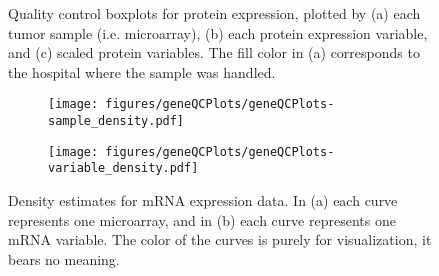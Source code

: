 \begin{figure}
	\centering
	\begin{subfigure}{1\textwidth}
		\centering
	\end{subfigure}
	\begin{subfigure}{1\textwidth}
		\centering
	\end{subfigure}
	\begin{subfigure}{1\textwidth}
		\centering
	\end{subfigure}

	\caption{Quality control boxplots for protein expression, plotted by
	(a) each tumor sample (i.e. microarray),
	(b) each protein expression variable, 
	and (c) scaled protein variables.
	The fill color in (a) corresponds to the hospital where the sample was handled.}
	\label{fig:qc-mrna-boxplot}
\end{figure}


\begin{figure}[!h]
	\centering
	\begin{subfigure}{.49\textwidth}
		\texttt{[image: figures/geneQCPlots/geneQCPlots-sample\_density.pdf]}
	\end{subfigure}
	\begin{subfigure}{.49\textwidth}
		\texttt{[image: figures/geneQCPlots/geneQCPlots-variable\_density.pdf]}
	\end{subfigure}

	\caption{Density estimates for mRNA expression data. In (a) each curve represents one microarray,
	and in (b) each curve represents one mRNA variable. The color of the curves is purely for visualization,
	it bears no meaning.}
	\label{fig:qc-mrna-density}
\end{figure}


